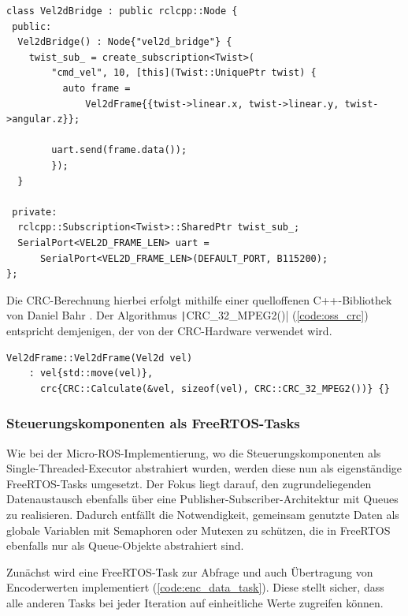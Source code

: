 \begin{code}
\begin{verbatim}
class Vel2dBridge : public rclcpp::Node {
 public:
  Vel2dBridge() : Node{"vel2d_bridge"} {
    twist_sub_ = create_subscription<Twist>(
        "cmd_vel", 10, [this](Twist::UniquePtr twist) {
          auto frame =
              Vel2dFrame{{twist->linear.x, twist->linear.y, twist->angular.z}};

        uart.send(frame.data());
        });
  }

 private:
  rclcpp::Subscription<Twist>::SharedPtr twist_sub_;
  SerialPort<VEL2D_FRAME_LEN> uart =
      SerialPort<VEL2D_FRAME_LEN>(DEFAULT_PORT, B115200);
};
\end{verbatim}
    \label{code:ros_node}
\end{code}

Die CRC-Berechnung hierbei erfolgt mithilfe einer quelloffenen C++-Bibliothek
von Daniel Bahr \cite{CRCpp}. Der Algorithmus \texttt|CRC_32_MPEG2()|
(\ref{code:oss_crc}) entspricht demjenigen, der von der CRC-Hardware verwendet
wird.

\begin{code}
\begin{verbatim}
Vel2dFrame::Vel2dFrame(Vel2d vel)
    : vel{std::move(vel)},
      crc{CRC::Calculate(&vel, sizeof(vel), CRC::CRC_32_MPEG2())} {}
\end{verbatim}
    \label{code:oss_crc}
\end{code}


\subsubsection{Steuerungskomponenten als FreeRTOS-Tasks}

Wie bei der Micro-ROS-Implementierung, wo die Steuerungskomponenten als
Single-Threaded-Executor abstrahiert wurden, werden diese nun als eigenständige
FreeRTOS-Tasks umgesetzt. Der Fokus liegt darauf, den zugrundeliegenden
Datenaustausch ebenfalls über eine Publisher-Subscriber-Architektur mit Queues
zu realisieren. Dadurch entfällt die Notwendigkeit, gemeinsam genutzte Daten als
globale Variablen mit Semaphoren oder Mutexen zu schützen, die in FreeRTOS
ebenfalls nur als Queue-Objekte abstrahiert sind.

Zunächst wird eine FreeRTOS-Task zur Abfrage und auch Übertragung von
Encoderwerten implementiert (\ref{code:enc_data_task}). Diese stellt sicher,
dass alle anderen Tasks bei jeder Iteration auf einheitliche Werte zugreifen
können.

